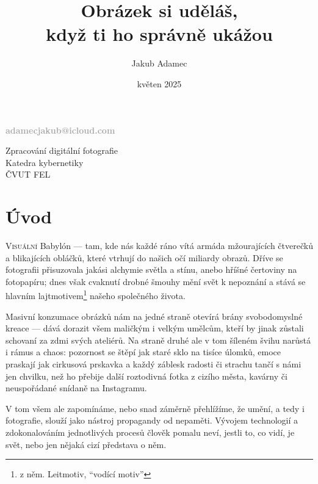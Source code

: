 \documentclass[12pt]{article}
\title{%
  Obrázek si uděláš, \\
  \large když ti ho správně ukážou}
\author{Jakub Adamec}
\date{květen 2025}
\begin{document}
\makeatletter
\begin{titlepage}
    \centering
    \vspace*{1cm}

    {\Huge\bfseries \textcolor{DarkGray}{\@title} \par}
    \vspace{2.5cm}

    {\Large\bfseries \textcolor{DarkGray}{\@author} \par}
    \vspace{0.2cm}

    {\bfseries \textcolor{DarkGray}{adamecjakub@icloud.com} \par}
    \vspace{1.5cm}

    {\large\bfseries \textcolor{DarkGray}{\@date} \par}
    \vfill

    \vspace*{1cm}
    {\large Zpracování digitální fotografie \\ Katedra kybernetiky \\ ČVUT FEL\par}
\end{titlepage}
\makeatother

\pagestyle{fancy}

\section{Úvod}
\lettrine[lines=3, findent=5pt, nindent=0pt]{V}{isuální} Babylón --- tam, kde nás každé ráno vítá 
armáda mžourajících čtverečků a blikajících obláčků, které vtrhují do našich očí miliardy obrazů. Dříve se fotografii 
přisuzovala jakási alchymie světla a stínu, anebo hříšné čertoviny na fotopapíru; dnes však cvaknutí drobné šmouhy mění 
svět k nepoznání a stává se hlavním lajtmotivem\footnote{z něm. Leitmotiv, \enquote{vodící motiv}} našeho společného 
života.

Masivní konzumace obrázků nám na jedné straně otevírá brány svobodomyslné kreace --- dává dorazit všem maličkým i 
velkým umělcům, kteří by jinak zůstali schovaní za zdmi svých ateliérů. Na straně druhé ale v tom šíleném švihu narůstá 
i rámus a chaos: pozornost se štěpí jak staré sklo na tisíce úlomků, emoce praskají jak cirkusová prskavka a každý 
záblesk radosti či strachu tančí s námi jen chvilku, než ho přebije další roztodivná fotka z cizího města, kavárny či 
neuspořádané snídaně na Instagramu.

V tom všem ale zapomínáme, nebo snad záměrně přehlížíme, že umění, a tedy i fotografie, slouží jako nástroj propagandy 
od nepaměti. Vývojem technologií a zdokonalováním jednotlivých procesů člověk pomalu neví, jestli to, co vidí, 
je svět, nebo jen nějaká cizí představa o něm.
\end{document}
